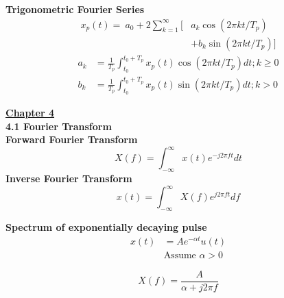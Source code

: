 \documentclass[landscape,a4paper]{extarticle}
\begin{document}
\begin{multicols*}{5}
    \textbf{Trigonometric Fourier Series}
    \begin{align*}
        x_p(t) = \ a_0 + 2\sum_{k=1}^{\infty} [ &a_k \cos(2\pi kt/T_p) \\
        &+ b_k \sin(2\pi kt/T_p)]
    \end{align*}
    \begin{align*}
        a_k&=\frac{1}{T_p}\int_{t_0}^{t_0+T_p}x_p(t)\cos(2\pi kt/T_p)dt; k \geq 0\\
        b_k&=\frac{1}{T_p}\int_{t_0}^{t_0+T_p}x_p(t)\sin(2\pi kt/T_p)dt; k > 0
        \tag{3.2}
    \end{align*}

    \textbf{\uline{Chapter 4}}\\
    \textbf{4.1 Fourier Transform}\\
    \textbf{Forward Fourier Transform}
    \[
        X(f)=\int_{-\infty}^{\infty}x(t)e^{-j2\pi ft}dt \tag{4.1a}
    \]
    \textbf{Inverse Fourier Transform}
    \[
       x(t)=\int_{-\infty}^{\infty}X(f)e^{j2\pi ft}df \tag{4.1b} 
    \]

    \textbf{Spectrum of exponentially decaying pulse}
    \begin{align*}
        x(t) &= Ae^{-\alpha t} u(t)\\
        &\text{Assume } \alpha > 0
    \end{align*}

    \[
        X(f) = \frac{A}{\alpha + j 2\pi f}
    \]



\end{multicols*}
\end{document}
